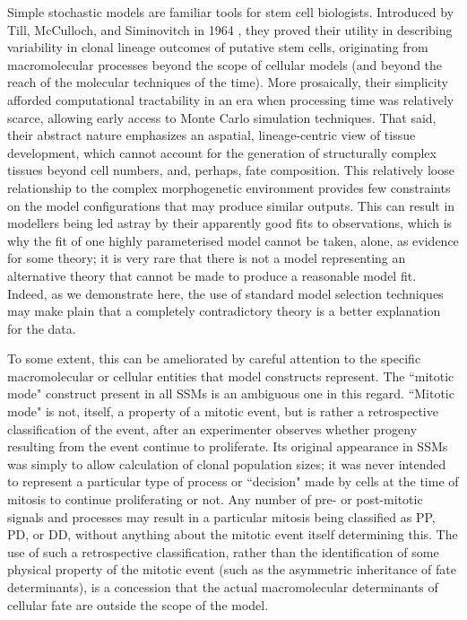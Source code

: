 Simple stochastic models are familiar tools for stem cell biologists. Introduced by Till, McCulloch, and Siminovitch in 1964 \cite{Till1964}, they proved their utility in describing variability in clonal lineage outcomes of putative stem cells, originating from macromolecular processes beyond the scope of cellular models (and beyond the reach of the molecular techniques of the time). More prosaically, their simplicity afforded computational tractability in an era when processing time was relatively scarce, allowing early access to Monte Carlo simulation techniques. That said, their abstract nature emphasizes an aspatial, lineage-centric view of tissue development, which cannot account for the generation of structurally complex tissues beyond cell numbers, and, perhaps, fate composition. This relatively loose relationship to the complex morphogenetic environment provides few constraints on the model configurations that may produce similar outputs. This can result in modellers being led astray by their apparently good fits to observations, which is why the fit of one highly parameterised model cannot be taken, alone, as evidence for some theory; it is very rare that there is not a model representing an alternative theory that cannot be made to produce a reasonable model fit. Indeed, as we demonstrate here, the use of standard model selection techniques may make plain that a completely contradictory theory is a better explanation for the data.

To some extent, this can be ameliorated by careful attention to the specific macromolecular or cellular entities that model constructs represent. The ``mitotic mode" construct present in all SSMs is an ambiguous one in this regard. ``Mitotic mode" is not, itself, a property of a mitotic event, but is rather a retrospective classification of the event, after an experimenter observes whether progeny resulting from the event continue to proliferate. Its original appearance in SSMs was simply to allow calculation of clonal population sizes; it was never intended to represent a particular type of process or ``decision" made by cells at the time of mitosis to continue proliferating or not. Any number of pre- or post-mitotic signals and processes may result in a particular mitosis being classified as PP, PD, or DD, without anything about the mitotic event itself determining this. The use of such a retrospective classification, rather than the identification of some physical property of the mitotic event (such as the asymmetric inheritance of fate determinants), is a concession that the actual macromolecular determinants of cellular fate are outside the scope of the model.

